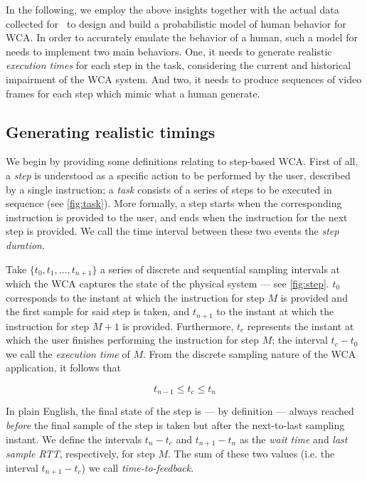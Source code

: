 In the following, we employ the above insights together with the actual data collected for~\cite{olguinmunoz:impact2021} to design and build a probabilistic model of human behavior for \ac{WCA}.
In order to accurately emulate the behavior of a human, such a model for needs to implement two main behaviors.
One, it needs to generate realistic \emph{execution times} for each step in the task, considering the current and historical impairment of the \ac{WCA} system.
And two, it needs to produce sequences of video frames for each step which mimic what a human generate.

\subsection{Generating realistic timings}

We begin by providing some definitions relating to step-based \acl{WCA}.
First of all, a \emph{step} is understood as a specific action to be performed by the user, described by a single instruction; a \emph{task} consists of a series of steps to be executed in sequence (see \cref{fig:task}).
More formally, a step starts when the corresponding instruction is provided to the user, and ends when the instruction for the next step is provided.
We call the time interval between these two events the \emph{step duration}.

Take \( \{ t_0, t_1, \ldots, t_{n + 1} \} \) a series of discrete and sequential sampling intervals at which the \ac{WCA} captures the state of the physical system --- see \cref{fig:step}.
\( t_0 \) corresponds to the instant at which the instruction for step \( M \) is provided and the first sample for said step is taken, and \( t_{n+1} \) to the instant at which the instruction for step \( M + 1 \) is provided.
Furthermore, \( t_c \) represents the instant at which the user finishes performing the instruction for step \( M \); the interval \( t_c - t_0 \) we call the \emph{execution time} of \( M \).
From the discrete sampling nature of the \ac{WCA} application, it follows that 

\begin{equation}\label{eq:tc}
    t_{n - 1} \leq t_c \leq t_{n}
\end{equation}

In plain English, the final state of the step is --- by definition --- always reached \emph{before} the final sample of the step is taken but after the next-to-last sampling instant.
We define the intervals \( t_n - t_c \) and \( t_{n + 1} - t_n \) as the \emph{wait time} and \emph{last sample \ac{RTT}}, respectively, for step \( M \).
The sum of these two values (i.e. the interval \( t_{n + 1} - t_c \)) we call \emph{time-to-feedback}.

